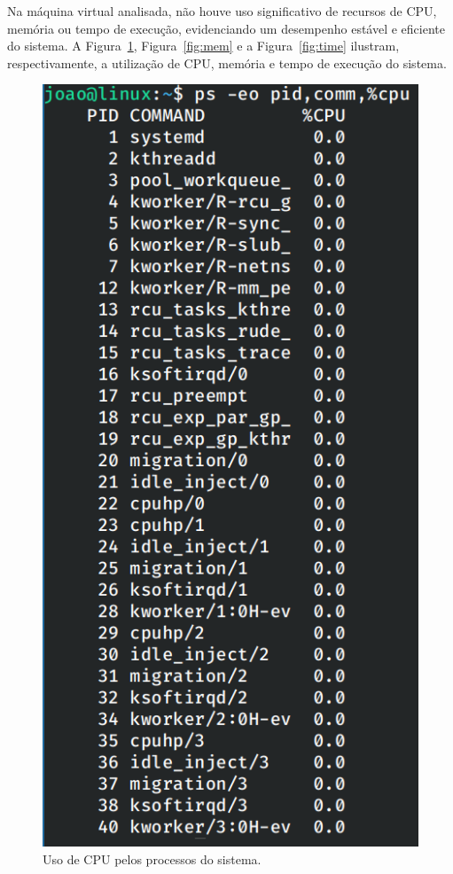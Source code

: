 \documentclass[
	12pt,				%
	oneside,   	        %
	a4paper,			%
	english,			%
	french,				%
	spanish,			%
	brazil,				%
	]{pacotes/abntex2}
\begin{document}
Na máquina virtual analisada, não houve uso significativo de recursos de CPU, memória ou tempo de execução, evidenciando um desempenho estável e eficiente do sistema. A Figura~\ref{fig:cpu}, Figura~\ref{fig:mem} e a Figura~\ref{fig:time} ilustram, respectivamente, a utilização de CPU, memória e tempo de execução do sistema.

\begin{figure}[H]
  \centering
  \includegraphics[scale=0.45]{figuras/cpu.png}
  \caption{Uso de CPU pelos processos do sistema.}
  \label{fig:cpu}
\end{figure}
\end{document}
